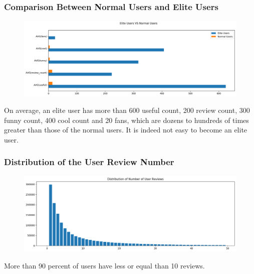 \documentclass[12pt]{article}
\begin{document}
\subsubsection{Comparison Between Normal Users and Elite Users}
\begin{figure}[H]
\begin{center}
    \includegraphics[width=1.0\textwidth]{../05_dataMining/eliteVSNormalUsers.png}
\end{center}
\end{figure}
On average, an elite user has more than 600 useful count, 200 review count, 300 funny count, 400 cool count and 20 fans, which are dozens to hundreds of times greater than those of the normal users. It is indeed not easy to become an elite user.

\subsubsection{Distribution of the User Review Number}
\begin{figure}[H]
\begin{center}
    \includegraphics[width=1.0\textwidth]{../05_dataMining/distributionNumUserReviews.png}
\end{center}
\end{figure}
More than 90 percent of users have less or equal than 10 reviews.
\end{document}
